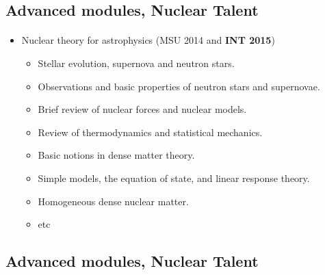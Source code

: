 \documentclass[%
twoside,                 %
final,                   %
10pt]{article}
\begin{document}
\noindent



\subsection*{Advanced  modules, Nuclear Talent}

\paragraph{}
\begin{itemize}
\item Nuclear theory for astrophysics (MSU 2014 and \textbf{INT 2015})
\begin{itemize}

  \item Stellar evolution, supernova and neutron stars.

  \item Observations and basic properties of neutron stars and supernovae.

  \item Brief review of nuclear forces and nuclear models.

  \item Review of thermodynamics and statistical mechanics.

  \item Basic notions in dense matter theory.

  \item Simple models, the equation of state, and linear response theory.

  \item Homogeneous dense nuclear matter.

  \item etc 
\end{itemize}

\noindent
\end{itemize}

\noindent



\subsection*{Advanced  modules, Nuclear Talent}

\end{document}
